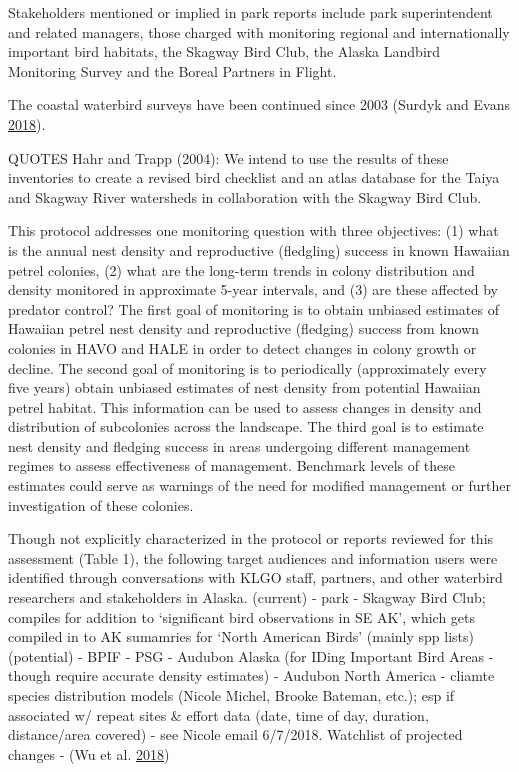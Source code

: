 \documentclass[]{article}
\begin{document}
Stakeholders mentioned or implied in park reports include park
superintendent and related managers, those charged with monitoring
regional and internationally important bird habitats, the Skagway Bird
Club, the Alaska Landbird Monitoring Survey and the Boreal Partners in
Flight.

The coastal waterbird surveys have been continued since 2003 (Surdyk and
Evans \protect\hyperlink{ref-Surdyk2018}{2018}).

QUOTES Hahr and Trapp (2004): We intend to use the results of these
inventories to create a revised bird checklist and an atlas database for
the Taiya and Skagway River watersheds in collaboration with the Skagway
Bird Club.

This protocol addresses one monitoring question with three objectives:
(1) what is the annual nest density and reproductive (fledgling) success
in known Hawaiian petrel colonies, (2) what are the long-term trends in
colony distribution and density monitored in approximate 5-year
intervals, and (3) are these affected by predator control? The first
goal of monitoring is to obtain unbiased estimates of Hawaiian petrel
nest density and reproductive (fledging) success from known colonies in
HAVO and HALE in order to detect changes in colony growth or decline.
The second goal of monitoring is to periodically (approximately every
five years) obtain unbiased estimates of nest density from potential
Hawaiian petrel habitat. This information can be used to assess changes
in density and distribution of subcolonies across the landscape. The
third goal is to estimate nest density and fledging success in areas
undergoing different management regimes to assess effectiveness of
management. Benchmark levels of these estimates could serve as warnings
of the need for modified management or further investigation of these
colonies.

Though not explicitly characterized in the protocol or reports reviewed
for this assessment (Table 1), the following target audiences and
information users were identified through conversations with KLGO staff,
partners, and other waterbird researchers and stakeholders in Alaska.
(current) - park - Skagway Bird Club; compiles for addition to
`significant bird observations in SE AK', which gets compiled in to AK
sumamries for `North American Birds' (mainly spp lists) (potential) -
BPIF - PSG - Audubon Alaska (for IDing Important Bird Areas - though
require accurate density estimates) - Audubon North America - cliamte
species distribution models (Nicole Michel, Brooke Bateman, etc.); esp
if associated w/ repeat sites \& effort data (date, time of day,
duration, distance/area covered) - see Nicole email 6/7/2018. Watchlist
of projected changes - (Wu et al. \protect\hyperlink{ref-Wu2018}{2018})
\end{document}
